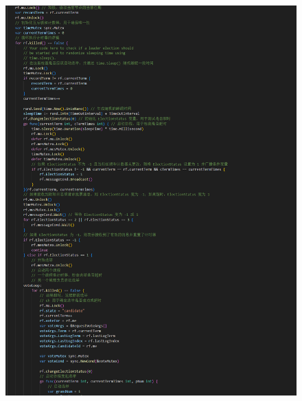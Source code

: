 \documentclass[]{article}
\begin{document}
\begin{itemize}
\begin{figure}[H]
			\includegraphics[height=0.9\textheight]{./2B/ticker1.png}
		\end{figure}
		\begin{figure}[H]
			\centering

\end{figure}
\end{itemize}
\end{document}
